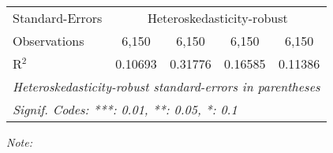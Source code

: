 \begin{table}[htbp!]
\begin{adjustbox}{width = 1\textwidth, max height = 0.95\textheight, center}
\begin{threeparttable}[b]
\begin{tabular}{lcccc}
            \midrule 
            Standard-Errors & \multicolumn{4}{c}{Heteroskedasticity-robust} \\ 
            Observations         & 6,150                          & 6,150                          & 6,150                           & 6,150\\  
            R$^2$                & 0.10693                        & 0.31776                        & 0.16585                         & 0.11386\\  
            \midrule \midrule
            \multicolumn{5}{l}{\emph{Heteroskedasticity-robust standard-errors in parentheses}}\\
            \multicolumn{5}{l}{\emph{Signif. Codes: ***: 0.01, **: 0.05, *: 0.1}}\\
         \end{tabular}
         
         \begin{tablenotes}\item \medskip \textit{Note:}
         \end{tablenotes}
      \end{threeparttable}
   \end{adjustbox}
\end{table}


